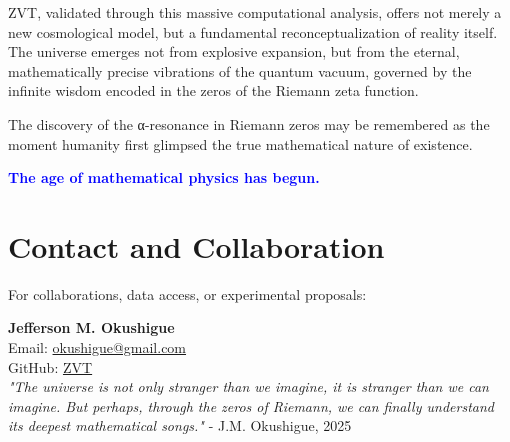 \documentclass[12pt, a4paper]{article}
\begin{document}
ZVT, validated through this massive computational analysis, offers not merely a new cosmological model, but a fundamental reconceptualization of reality itself. The universe emerges not from explosive expansion, but from the eternal, mathematically precise vibrations of the quantum vacuum, governed by the infinite wisdom encoded in the zeros of the Riemann zeta function.

The discovery of the α-resonance in Riemann zeros may be remembered as the moment humanity first glimpsed the true mathematical nature of existence.

\textcolor{blue}{\textbf{The age of mathematical physics has begun.}}

\section{Contact and Collaboration}

For collaborations, data access, or experimental proposals:

\textbf{Jefferson M. Okushigue} \\
Email: \href{mailto:okushigue@gmail.com}{okushigue@gmail.com} \\
GitHub: \href{https://github.com/okushigue/zvt}{ZVT} \\


\textit{"The universe is not only stranger than we imagine, it is stranger than we can imagine. But perhaps, through the zeros of Riemann, we can finally understand its deepest mathematical songs."} - J.M. Okushigue, 2025
\end{document}
